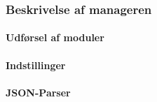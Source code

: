 \subsubsection{Beskrivelse af manageren}

\paragraph{Udførsel af moduler}

\paragraph{Indstillinger}\label{sec:settings}

\paragraph{JSON-Parser}\label{subsub:JSONparser}


